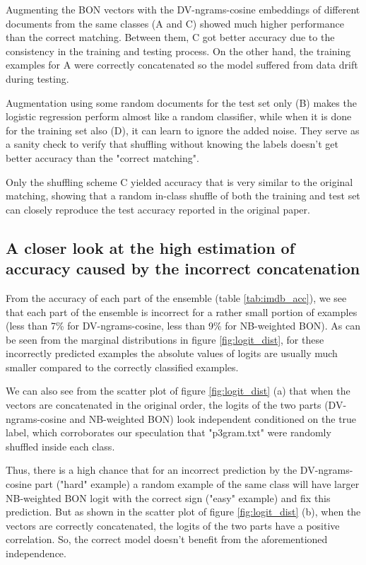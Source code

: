 \documentclass[11pt]{article}
\begin{document}
Augmenting the BON vectors with the DV-ngrams-cosine embeddings of different documents from the same classes (A and C) showed much higher performance than the correct matching. Between them, C got better accuracy due to the consistency in the training and testing process. On the other hand, the training examples for A were correctly concatenated so the model suffered from data drift during testing.

Augmentation using some random documents for the test set only (B) makes the logistic regression perform almost like a random classifier, while when it is done for the training set also (D), it can learn to ignore the added noise. They serve as a sanity check to verify that shuffling without knowing the labels doesn't get better accuracy than the "correct matching".

Only the shuffling scheme C yielded accuracy that is very similar to the original matching, showing that a random in-class shuffle of both the training and test set can closely reproduce the test accuracy reported in the original paper.

\subsection{A closer look at the high estimation of accuracy caused by the incorrect concatenation}
\label{sec:subsec_hard_n_easy}
From the accuracy of each part of the ensemble (table \ref{tab:imdb_acc}), we see that each part of the ensemble is incorrect for a rather small portion of examples (less than 7\% for DV-ngrams-cosine, less than 9\% for NB-weighted BON). As can be seen from the marginal distributions in figure \ref{fig:logit_dist}, for these incorrectly predicted examples the absolute values of logits are usually much smaller compared to the correctly classified examples. 

We can also see from the scatter plot of figure \ref{fig:logit_dist} (a) that when the vectors are concatenated in the original order, the logits of the two parts (DV-ngrams-cosine and NB-weighted BON) look independent conditioned on the true label, which corroborates our speculation that "p3gram.txt" were randomly shuffled inside each class. 

Thus, there is a high chance that for an incorrect prediction by the DV-ngrams-cosine part ("hard" example) a random example of the same class will have larger NB-weighted BON logit with the correct sign ("easy" example) and fix this prediction. But as shown in the scatter plot of figure \ref{fig:logit_dist} (b), when the vectors are correctly concatenated, the logits of the two parts have a positive correlation. So, the correct model doesn't benefit from the aforementioned independence.
\end{document}
